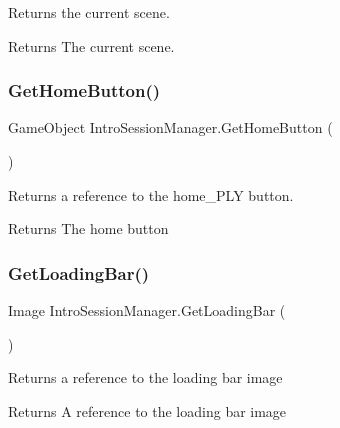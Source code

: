 Returns the current scene. 

\begin{DoxyReturn}{Returns}
The current scene.
\end{DoxyReturn}
\mbox{\label{class_intro_session_manager_a7ce12de7f1dfcec0ad8b57f7e867a30d}} 
\subsubsection{\texorpdfstring{Get\+Home\+Button()}{GetHomeButton()}}
{\footnotesize\ttfamily Game\+Object Intro\+Session\+Manager.\+Get\+Home\+Button (\begin{DoxyParamCaption}{ }\end{DoxyParamCaption})}



Returns a reference to the {\ttfamily home\+\_\+\+P\+LY} button. 

\begin{DoxyReturn}{Returns}
The home button
\end{DoxyReturn}
\mbox{\label{class_intro_session_manager_a918fbca0cbe7a7769c8a777e059f1375}} 
\subsubsection{\texorpdfstring{Get\+Loading\+Bar()}{GetLoadingBar()}}
{\footnotesize\ttfamily Image Intro\+Session\+Manager.\+Get\+Loading\+Bar (\begin{DoxyParamCaption}{ }\end{DoxyParamCaption})}



Returns a reference to the loading bar image 

\begin{DoxyReturn}{Returns}
A reference to the loading bar image
\end{DoxyReturn}
\mbox{\label{class_intro_session_manager_a8932e2f5e73d5f9915a703f87e5c9f49}} 
